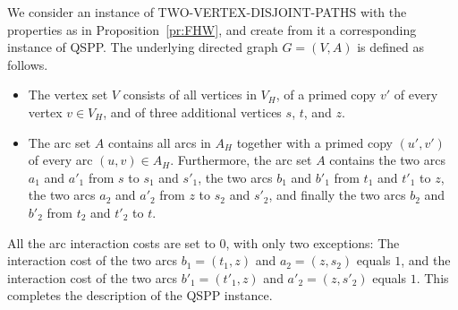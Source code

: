 We consider an instance of TWO-VERTEX-DISJOINT-PATHS with the properties as in Proposition~\ref{pr:FHW},
and create from it a corresponding instance of QSPP.
The underlying directed graph $G=(V,A)$ is defined as follows.
\begin{itemize}
\item The vertex set $V$ consists of all vertices in $V_H$, of a primed copy $v'$ of every
vertex $v\in V_H$, and of three additional vertices $s$, $t$, and $z$.
\item The arc set $A$ contains all arcs in $A_H$ together with a primed copy $(u',v')$
of every arc $(u,v)\in A_H$.
Furthermore, the arc set $A$ contains
the two arcs $a_1$ and $a'_1$ from $s$ to $s_1$ and $s'_1$,
the two arcs $b_1$ and $b'_1$ from $t_1$ and $t'_1$ to $z$,
the two arcs $a_2$ and $a'_2$ from $z$ to $s_2$ and $s'_2$, and finally
the two arcs $b_2$ and $b'_2$ from $t_2$ and $t'_2$ to $t$.
\end{itemize}
All the arc interaction costs are set to $0$, with only two exceptions:
The interaction cost of the two arcs $b_1=(t_1,z)$ and $a_2=(z,s_2)$ equals $1$, and
the interaction cost of the two arcs $b'_1=(t'_1,z)$ and $a'_2=(z,s'_2)$ equals $1$.
This completes the description of the QSPP instance.

